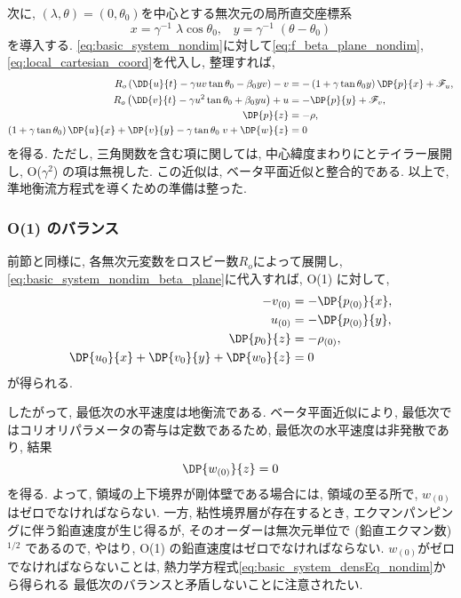 次に, $(\lambda, \theta)=(0,\theta_0)$を中心とする無次元の局所直交座標系
\begin{equation}
  x = \gamma^{-1} \; \lambda \cos{\theta_0}, \;\;\; 
  y = \gamma^{-1} \; (\theta - \theta_0)
\label{eq:local_cartesian_coord}
\end{equation} 
を導入する. 
\eqref{eq:basic_system_nondim}に対して\eqref{eq:f_beta_plane_nondim}, \eqref{eq:local_cartesian_coord}を代入し, 整理すれば,   
\begin{subequations} %
  \begin{align}
    R_o \left( \DD{u}{t} - \gamma uv \tan\theta_0 - \beta_0 y v \right)  - v  
      &= - \left(1+\gamma \tan{\theta_0}y \right)\DP{p}{x} + \mathscr{F}_u, \\
    R_o \left( \DD{v}{t} - \gamma u^2 \tan\theta_0 + \beta_0 y u\right)   + u 
      &= - \DP{p}{y} + \mathscr{F}_v, \\
    \DP{p}{z} &= - \rho, \\
    \left(1 + \gamma \tan\theta_0 \right) \DP{u}{x} 
      + \DP{v}{y} - \gamma \tan\theta_0 \; v + \DP{w}{z} &= 0 
  \end{align}
\label{eq:basic_system_nondim_beta_plane}
\end{subequations}
を得る. 
ただし, 三角関数を含む項に関しては, 中心緯度まわりにとテイラー展開し, 
O($\gamma^2$) の項は無視した. 
この近似は, ベータ平面近似と整合的である. 
以上で, 準地衡流方程式を導くための準備は整った. 

\subsubsection*{O(1) のバランス}
前節と同様に, 各無次元変数をロスビー数$R_o$によって展開し, 
\eqref{eq:basic_system_nondim_beta_plane}に代入すれば, 
O(1) に対して, 
\begin{subequations} %
\begin{align}
  - v_{(0)} &= - \DP{p_{(0)}}{x}, \\
   u_{(0)}  &= - \DP{p_{(0)}}{y}, \\
   \DP{p_0}{z} &= - \rho_{(0)}, \\
   \DP{u_0}{x} + \DP{v_0}{y} + \DP{w_0}{z} &= 0
\end{align}
\label{eq:qg_order1}
\end{subequations}
が得られる. 

したがって, 最低次の水平速度は地衡流である. 
ベータ平面近似により, 最低次ではコリオリパラメータの寄与は定数であるため, 
最低次の水平速度は非発散であり, 
結果
\begin{equation}
  \DP{w_{(0)}}{z} = 0
\end{equation}
を得る. 
よって, 領域の上下境界が剛体壁である場合には, 
領域の至る所で, $w_{(0)}$はゼロでなければならない. 
一方, 粘性境界層が存在するとき, エクマンパンピングに伴う鉛直速度が生じ得るが, 
そのオーダーは無次元単位で (鉛直エクマン数)$^{1/2}$ であるので, 
やはり, O(1) の鉛直速度はゼロでなければならない.  
$w_{(0)}$がゼロでなければならないことは, 熱力学方程式\eqref{eq:basic_system_densEq_nondim}から得られる
最低次のバランスと矛盾しないことに注意されたい. 

